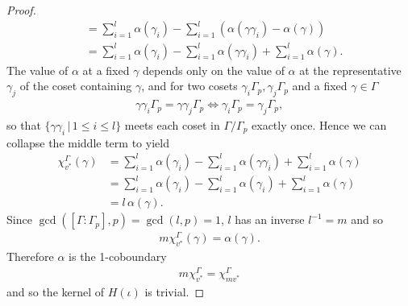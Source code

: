 \begin{proof}
\begin{align*}
	&=  \sum_{i = 1}^l\alpha(\gamma_i) - \sum_{i = 1}^l \left(\alpha(\gamma\gamma_i) - \alpha(\gamma) \right)\\
	&=  \sum_{i = 1}^l\alpha(\gamma_i) - \sum_{i = 1}^l \alpha(\gamma\gamma_i) +\sum_{i = 1}^l \alpha(\gamma).
\end{align*}
The value of $\alpha$ at a fixed $\gamma$ depends only on the value of $\alpha$ at the representative $\gamma_j$ of the coset containing $\gamma$, and for two cosets $\gamma_i \Gamma_p, \gamma_j \Gamma_p$ and a fixed $\gamma \in \Gamma$
\begin{align}
  \gamma \gamma_i \Gamma_p = \gamma \gamma_j \Gamma_p \Leftrightarrow \gamma_i \Gamma_p = \gamma_j \Gamma_p,
\end{align}
so that $\{\gamma \gamma_i \,|\, 1 \leq i \leq l\}$ meets each coset in $\Gamma/\Gamma_p$ exactly once. Hence we can collapse the middle term to yield
\begin{align*}
	\chi_{v^*}^\Gamma(\gamma) 
	&=  \sum_{i = 1}^l\alpha(\gamma_i) - \sum_{i = 1}^l \alpha(\gamma\gamma_i) +\sum_{i = 1}^l \alpha(\gamma)\\
	&=  \sum_{i = 1}^l\alpha(\gamma_i) - \sum_{i = 1}^l \alpha(\gamma_i) +\sum_{i = 1}^l \alpha(\gamma) \\
	&=  l\, \alpha(\gamma).
\end{align*}
Since $\gcd([\Gamma:\Gamma_p], p) = \gcd(l,p) = 1$, $l$ has an inverse $l^{-1} = m$ and so
\begin{align*}
	m\chi_{v^*}^\Gamma(\gamma) = \alpha(\gamma).
\end{align*}
Therefore $\alpha$ is the 1-coboundary
\begin{align}
  m\chi_{v^*}^\Gamma = \chi_{mv^*}^\Gamma
\end{align}
and so the kernel of $H(\iota)$ is trivial.
\end{proof}

